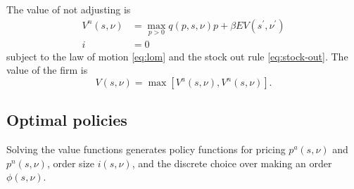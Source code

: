 \documentclass[11pt, pdftex]{article}
\begin{document}
The value of not adjusting is
\begin{align}
  V^n(s,\nu) &= \max_{p>0} q(p,s,\nu)p+\beta EV(s^\prime,\nu^\prime)\\
  i&=0
\end{align}
subject to the law of motion \eqref{eq:lom} and the stock out rule \eqref{eq:stock-out}. The value of the firm is
\begin{equation}\label{}
  V(s,\nu)=\max[V^a(s,\nu),V^n(s,\nu)].
\end{equation}

\subsection{Optimal policies}
Solving the value functions generates policy functions for pricing $p^a(s,\nu)$ and $p^n(s,\nu)$, order size $i(s,\nu)$, and the discrete choice over making an order $\phi(s,\nu)$.
\end{document}
